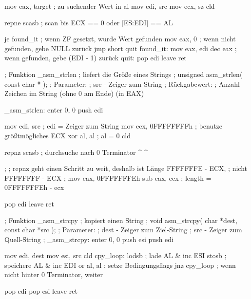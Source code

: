 \begin{AsmCodeListing}[label=memory.asm, numbers=left, commandchars=\\\{\}]
         mov     eax, target     ; zu suchender Wert in al
         mov     edi, src
         mov     ecx, sz
         cld

         repne   scasb           ; scan bis ECX == 0 oder [ES:EDI] == AL

         je      found_it        ; wenn ZF gesetzt, wurde Wert gefunden
         mov     eax, 0          ; wenn nicht gefunden, gebe NULL zur\"{u}ck
         jmp     short quit
 found_it:
         mov     eax, edi
         dec     eax             ; wenn gefunden, gebe (EDI - 1) zur\"{u}ck
 quit:
         pop     edi
         leave
         ret

 ; Funktion _asm_strlen
 ; liefert die Gr\"{o}{\ss}e eines Strings
 ; unsigned asm_strlen( const char * );
 ; Parameter:
 ;   src - Zeiger zum String
 ; R\"{u}ckgabewert:
 ;   Anzahl Zeichen im String (ohne 0 am Ende) (in EAX)

 _asm_strlen:
         enter   0, 0
         push    edi

         mov     edi, src        ; edi = Zeiger zum String
         mov     ecx, 0FFFFFFFFh ; benutze gr\"{o}{\ss}tm\"{o}gliches ECX
         xor     al, al          ; al = 0
         cld

         repnz   scasb           ; durchsuche nach 0 Terminator
\enlargethispage{\baselineskip} ^%
^%

 ;
 ; repnz geht einen Schritt zu weit, deshalb ist L\"{a}nge FFFFFFFE - ECX,
 ; nicht FFFFFFFF - ECX
 ;
         mov     eax, 0FFFFFFFEh
         sub     eax, ecx        ; length = 0FFFFFFFEh - ecx

         pop     edi
         leave
         ret

 ; Funktion _asm_strcpy
 ; kopiert einen String
 ; void asm_strcpy( char *dest, const char *src );
 ; Parameter:
 ;   dest - Zeiger zum Ziel-String
 ;   src  - Zeiger zum Quell-String
 ;
 _asm_strcpy:
         enter   0, 0
         push    esi
         push    edi

         mov     edi, dest
         mov     esi, src
         cld
 cpy_loop:
         lodsb                   ; lade AL & inc ESI
         stosb                   ; speichere AL & inc EDI
         or      al, al          ; setze Bedingungsflags
         jnz     cpy_loop        ; wenn nicht hinter 0 Terminator, weiter

         pop     edi
         pop     esi
         leave
         ret
\end{AsmCodeListing}

